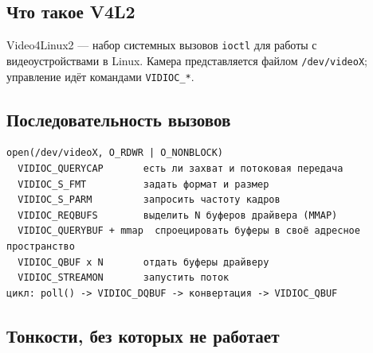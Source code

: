 \documentclass[11pt,a4paper]{article}
\theoremstyle{definition}
\theoremstyle{remark}
\begin{document}
\subsection{Что такое V4L2}

Video4Linux2 --- набор системных вызовов \texttt{ioctl} для работы с
видеоустройствами в Linux. Камера представляется файлом \texttt{/dev/videoX};
управление идёт командами \texttt{VIDIOC\_*}.

\subsection{Последовательность вызовов}

\begin{lstlisting}[style=shell]
open(/dev/videoX, O_RDWR | O_NONBLOCK)
  VIDIOC_QUERYCAP       есть ли захват и потоковая передача
  VIDIOC_S_FMT          задать формат и размер
  VIDIOC_S_PARM         запросить частоту кадров
  VIDIOC_REQBUFS        выделить N буферов драйвера (MMAP)
  VIDIOC_QUERYBUF + mmap  спроецировать буферы в своё адресное пространство
  VIDIOC_QBUF x N       отдать буферы драйверу
  VIDIOC_STREAMON       запустить поток
цикл: poll() -> VIDIOC_DQBUF -> конвертация -> VIDIOC_QBUF
\end{lstlisting}

\subsection{Тонкости, без которых не работает}
\end{document}
